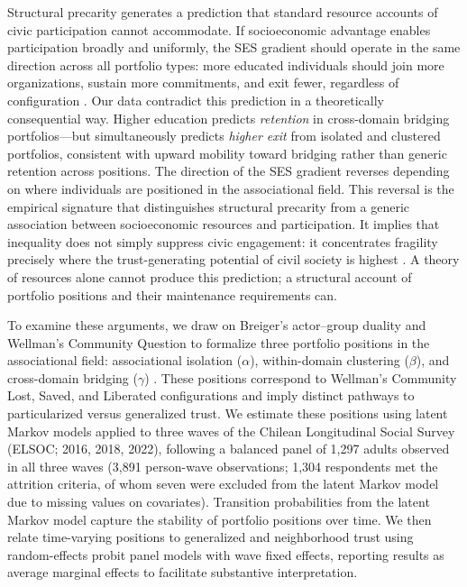 Structural precarity generates a prediction that standard resource accounts
of civic participation cannot accommodate. If socioeconomic advantage enables participation broadly and uniformly, the SES gradient should operate in the same direction across all portfolio types: more educated individuals should join more organizations, sustain more commitments, and exit fewer, regardless of configuration \parencite{paxton_association_2007,
paxton_social_2002}. Our data contradict this prediction in a theoretically consequential way. Higher education predicts \textit{retention} in cross-domain bridging portfolios---but simultaneously predicts \textit{higher exit} from isolated and clustered portfolios, consistent with upward mobility toward bridging rather than generic retention across positions. The direction of the SES gradient reverses depending on where individuals are positioned in the associational field. This reversal is the empirical signature that distinguishes structural precarity from a generic association between socioeconomic resources and participation. It implies that inequality does not simply suppress civic engagement: it concentrates fragility precisely where the trust-generating potential of civil society is highest \parencite{stolle1998all, cook2005cooperation}. A theory of resources alone cannot produce this prediction; a structural account of portfolio positions and their maintenance requirements can.

To examine these arguments, we draw on Breiger's actor--group duality and Wellman's Community Question to formalize three portfolio positions in the associational field: associational isolation ($\alpha$), within-domain clustering ($\beta$), and cross-domain bridging ($\gamma$) \parencite{breiger_duality_1974, wellman_community_1979}. These positions correspond to Wellman's Community Lost, Saved, and Liberated configurations and imply distinct pathways to particularized versus generalized trust. We estimate these positions using latent Markov models applied to three waves of the Chilean Longitudinal Social Survey (ELSOC; 2016, 2018, 2022), following a balanced panel of 1{,}297 adults observed in all three waves (3{,}891 person-wave observations; 1{,}304 respondents met the attrition criteria, of whom seven were excluded from the latent Markov model due to missing values on covariates). Transition probabilities from the latent Markov model capture the stability of portfolio positions over time. We then relate time-varying positions to generalized and neighborhood trust using random-effects probit panel models with wave fixed effects, reporting results as average marginal effects to facilitate substantive interpretation.

